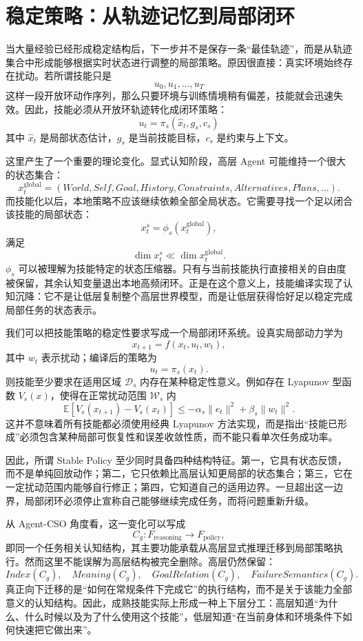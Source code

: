 \section{稳定策略：从轨迹记忆到局部闭环}

当大量经验已经形成稳定结构后，下一步并不是保存一条“最佳轨迹”，而是从轨迹集合中形成能够根据实时状态进行调整的局部策略。原因很直接：真实环境始终存在扰动。若所谓技能只是
\[
u_0,u_1,\ldots,u_T
\]
这样一段开放环动作序列，那么只要环境与训练情境稍有偏差，技能就会迅速失效。因此，技能必须从开放环轨迹转化成闭环策略：
\[
\boxed{
u_t
=
\pi_s(\hat x_t,g_s,c_s)
}
\]
其中 $\hat x_t$ 是局部状态估计，$g_s$ 是当前技能目标，$c_s$ 是约束与上下文。

这里产生了一个重要的理论变化。显式认知阶段，高层 Agent 可能维持一个很大的状态集合：
\[
x_t^{\mathrm{global}}
=
\left(
World,
Self,
Goal,
History,
Constraints,
Alternatives,
Plans,\ldots
\right).
\]
而技能化以后，本地策略不应该继续依赖全部全局状态。它需要寻找一个足以闭合该技能的局部状态：
\[
x_t^{s}
=
\phi_s(x_t^{\mathrm{global}}),
\]
满足
\[
\dim x_t^{s}
\ll
\dim x_t^{\mathrm{global}}.
\]
$\phi_s$ 可以被理解为技能特定的状态压缩器。只有与当前技能执行直接相关的自由度被保留，其余认知变量退出本地高频闭环。正是在这个意义上，技能编译实现了认知沉降：它不是让低层复制整个高层世界模型，而是让低层获得恰好足以稳定完成局部任务的状态表示。

我们可以把技能策略的稳定性要求写成一个局部闭环系统。设真实局部动力学为
\[
x_{t+1}
=
f(x_t,u_t,w_t),
\]
其中 $w_t$ 表示扰动；编译后的策略为
\[
u_t=\pi_s(x_t).
\]
则技能至少要求在适用区域 $\mathcal D_s$ 内存在某种稳定性意义。例如存在 Lyapunov 型函数 $V_s(x)$，使得在正常扰动范围 $\mathcal W_s$ 内
\[
\mathbb E
\left[
V_s(x_{t+1})-V_s(x_t)
\right]
\le
-\alpha_s\|e_t\|^2+\beta_s\|w_t\|^2.
\]
这并不意味着所有技能都必须使用经典 Lyapunov 方法实现，而是指出“技能已形成”必须包含某种局部可恢复性和误差收敛性质，而不能只看单次任务成功率。

因此，所谓 Stable Policy 至少同时具备四种结构特征。第一，它具有状态反馈，而不是单纯回放动作；第二，它只依赖比高层认知更局部的状态集合；第三，它在一定扰动范围内能够自行修正；第四，它知道自己的适用边界。一旦超出这一边界，局部闭环必须停止宣称自己能够继续完成任务，而将问题重新升级。

从 Agent-CSO 角度看，这一变化可以写成
\[
C_g:
F_{\mathrm{reasoning}}
\longrightarrow
F_{\mathrm{policy}},
\]
即同一个任务相关认知结构，其主要功能承载从高层显式推理迁移到局部策略执行。然而这里不能误解为高层结构被完全删除。高层仍然保留：
\[
Index(C_g),
\quad
Meaning(C_g),
\quad
GoalRelation(C_g),
\quad
FailureSemantics(C_g).
\]
真正向下迁移的是“如何在常规条件下完成它”的执行结构，而不是关于该能力全部意义的认知结构。因此，成熟技能实际上形成一种上下层分工：高层知道“为什么、什么时候以及为了什么使用这个技能”，低层知道“在当前身体和环境条件下如何快速把它做出来”。

